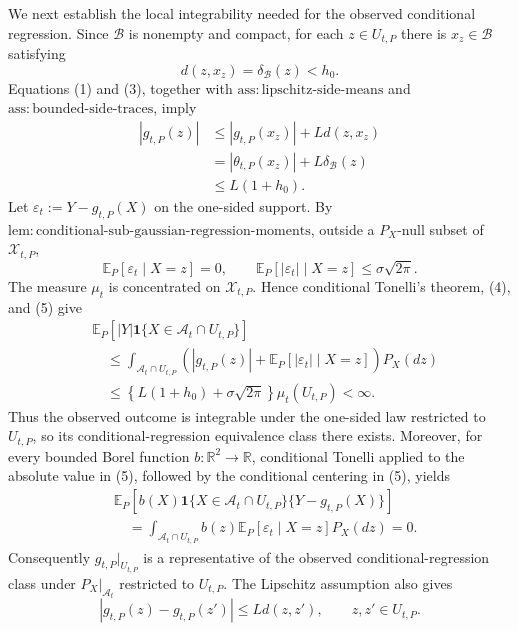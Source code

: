 We next establish the local integrability needed for the observed conditional regression. Since \(\mathcal B\) is nonempty and compact, for each \(z\in U_{t,P}\) there is \(x_z\in\mathcal B\) satisfying
\[
 d(z,x_z)=\delta_{\mathcal B}(z)<h_0.
\]
Equations (1) and (3), together with \(\mathrm{ass:lipschitz\text{-}side\text{-}means}\) and \(\mathrm{ass:bounded\text{-}side\text{-}traces}\), imply
\[
 \begin{aligned}
 |g_{t,P}(z)|
 &\le |g_{t,P}(x_z)|+Ld(z,x_z)\\
 &=|\theta_{t,P}(x_z)|+L\delta_{\mathcal B}(z)\\
 &\le L(1+h_0).
 \end{aligned}
 \tag{4}
\]
Let \(\varepsilon_t:=Y-g_{t,P}(X)\) on the one-sided support. By \(\mathrm{lem:conditional\text{-}sub\text{-}gaussian\text{-}regression\text{-}moments}\), outside a \(P_X\)-null subset of \(\mathcal X_{t,P}\),
\[
 \mathbb E_P[\varepsilon_t\mid X=z]=0,
 \qquad
 \mathbb E_P[|\varepsilon_t|\mid X=z]\le\sigma\sqrt{2\pi}.
 \tag{5}
\]
The measure \(\mu_t\) is concentrated on \(\mathcal X_{t,P}\). Hence conditional Tonelli's theorem, (4), and (5) give
\[
 \begin{aligned}
 &\mathbb E_P\!\left[|Y|\mathbf 1\{X\in\mathcal A_t\cap U_{t,P}\}\right]\\
 &\quad\le
 \int_{\mathcal A_t\cap U_{t,P}}
 \left(|g_{t,P}(z)|+\mathbb E_P[|\varepsilon_t|\mid X=z]\right)P_X(dz)\\
 &\quad\le
 \left\{L(1+h_0)+\sigma\sqrt{2\pi}\right\}\mu_t(U_{t,P})<\infty.
 \end{aligned}
 \tag{6}
\]
Thus the observed outcome is integrable under the one-sided law restricted to \(U_{t,P}\), so its conditional-regression equivalence class there exists. Moreover, for every bounded Borel function \(b:\mathbb R^2\to\mathbb R\), conditional Tonelli applied to the absolute value in (5), followed by the conditional centering in (5), yields
\[
 \begin{aligned}
 &\mathbb E_P\!\left[b(X)\mathbf 1\{X\in\mathcal A_t\cap U_{t,P}\}
       \{Y-g_{t,P}(X)\}\right]\\
 &\quad=
 \int_{\mathcal A_t\cap U_{t,P}}b(z)
       \mathbb E_P[\varepsilon_t\mid X=z]P_X(dz)=0.
 \end{aligned}
 \tag{7}
\]
Consequently \(g_{t,P}|_{U_{t,P}}\) is a representative of the observed conditional-regression class under \(P_X|_{\mathcal A_t}\) restricted to \(U_{t,P}\). The Lipschitz assumption also gives
\[
 |g_{t,P}(z)-g_{t,P}(z')|\le Ld(z,z'),
 \qquad z,z'\in U_{t,P}.
 \tag{8}
\]

